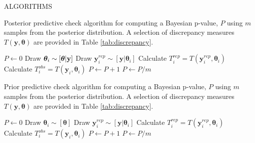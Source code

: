 \documentclass[12pt,english]{article}
\begin{document}
\begin{spacing}{1.9}
\pagebreak

ALGORITHMS

\begin{algorithm}
\caption{Posterior predictive check algorithm for computing a Bayesian p-value, $P$ using $m$ samples from the posterior distribution.  A selection of discrepancy measures $T(\textbf{y},\boldsymbol{\theta})$ are provided in Table \ref{tab:discrepancy}.}
\label{alg:posterior}
\begin{algorithmic}
\STATE $P \leftarrow 0$
  \STATE Draw $\boldsymbol{\theta}_i \sim [\boldsymbol{\theta}|{\bf y}]$
  \STATE Draw $\textbf{y}_i^{rep} \sim [\textbf{y} | \boldsymbol{\theta}_i]$ \STATE Calculate $T_i^{rep} = T(\textbf{y}_i^{rep},\boldsymbol{\theta}_i)$
  \STATE Calculate $T_i^{obs} = T(\textbf{y}_i,\boldsymbol{\theta}_i)$
    \STATE $P \leftarrow P+1$
  \ENDIF
\ENDFOR
\STATE $P \leftarrow P/m$
\end{algorithmic}
\end{algorithm}

\begin{algorithm}
\caption{Prior predictive check algorithm for computing a Bayesian p-value, $P$ using $m$ samples from the posterior distribution. A selection of discrepancy measures $T(\textbf{y},\boldsymbol{\theta})$ are provided in Table \ref{tab:discrepancy}.}
\label{alg:prior}
\begin{algorithmic}
\STATE $P \leftarrow 0$
  \STATE Draw $\boldsymbol{\theta}_i \sim [\boldsymbol{\theta}]$
  \STATE Draw $\textbf{y}_i^{rep} \sim [\textbf{y} | \boldsymbol{\theta}_i]$ \STATE Calculate $T_i^{rep} = T(\textbf{y}_i^{rep},\boldsymbol{\theta}_i)$
  \STATE Calculate $T_i^{obs} = T(\textbf{y}_i,\boldsymbol{\theta}_i)$
    \STATE $P \leftarrow P+1$
  \ENDIF
\ENDFOR
\STATE $P \leftarrow P/m$
\end{algorithmic}
\end{algorithm}


\end{spacing}
\end{document}
